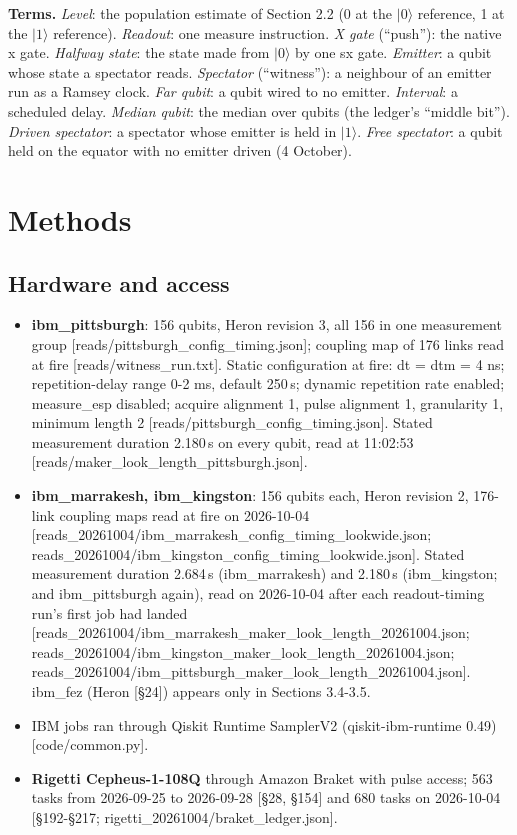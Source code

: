 \documentclass[11pt]{article}
\begin{document}
\textbf{Terms.} \emph{Level}: the population estimate of Section 2.2 (0 at the \(|0\rangle\) reference, 1 at the \(|1\rangle\) reference). \emph{Readout}: one measure instruction. \emph{X gate} (``push''): the native x gate. \emph{Halfway state}: the state made from \(|0\rangle\) by one sx gate. \emph{Emitter}: a qubit whose state a spectator reads. \emph{Spectator} (``witness''): a neighbour of an emitter run as a Ramsey clock. \emph{Far qubit}: a qubit wired to no emitter. \emph{Interval}: a scheduled delay. \emph{Median qubit}: the median over qubits (the ledger's ``middle bit''). \emph{Driven spectator}: a spectator whose emitter is held in \(|1\rangle\). \emph{Free spectator}: a qubit held on the equator with no emitter driven (4 October).

\section{Methods}
\subsection{Hardware and access}
\begin{itemize}
\item \textbf{ibm\_pittsburgh}: 156 qubits, Heron revision 3, all 156 in one measurement group {[}reads/pittsburgh\_config\_timing.json{]}; coupling map of 176 links read at fire {[}reads/witness\_run.txt{]}. Static configuration at fire: dt = dtm = 4 ns; repetition-delay range 0-2 ms, default 250\,\textmu s; dynamic repetition rate enabled; measure\_esp disabled; acquire alignment 1, pulse alignment 1, granularity 1, minimum length 2 {[}reads/pittsburgh\_config\_timing.json{]}. Stated measurement duration 2.180\,\textmu s on every qubit, read at 11:02:53 {[}reads/maker\_look\_length\_pittsburgh.json{]}.
\item \textbf{ibm\_marrakesh, ibm\_kingston}: 156 qubits each, Heron revision 2, 176-link coupling maps read at fire on 2026-10-04 {[}reads\_20261004/ibm\_marrakesh\_config\_timing\_lookwide.json; reads\_20261004/ibm\_kingston\_config\_timing\_lookwide.json{]}. Stated measurement duration 2.684\,\textmu s (ibm\_marrakesh) and 2.180\,\textmu s (ibm\_kingston; and ibm\_pittsburgh again), read on 2026-10-04 after each readout-timing run's first job had landed {[}reads\_20261004/ibm\_marrakesh\_maker\_look\_length\_20261004.json; reads\_20261004/ibm\_kingston\_maker\_look\_length\_20261004.json; reads\_20261004/ibm\_pittsburgh\_maker\_look\_length\_20261004.json{]}. ibm\_fez (Heron {[}\S{}24{]}) appears only in Sections 3.4-3.5.
\item IBM jobs ran through Qiskit Runtime SamplerV2 (qiskit-ibm-runtime 0.49) {[}code/common.py{]}.
\item \textbf{Rigetti Cepheus-1-108Q} through Amazon Braket with pulse access; 563 tasks from 2026-09-25 to 2026-09-28 {[}\S{}28, \S{}154{]} and 680 tasks on 2026-10-04 {[}\S{}192-\S{}217; rigetti\_20261004/braket\_ledger.json{]}.
\end{itemize}
\end{document}
